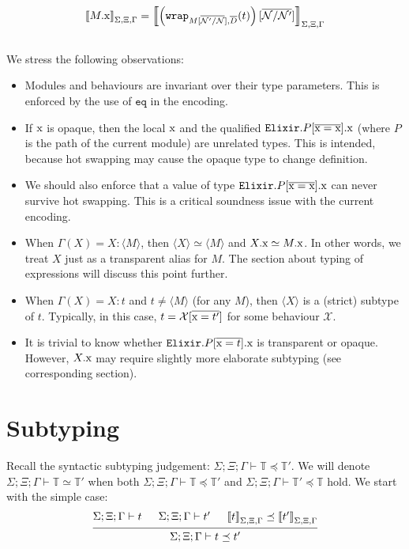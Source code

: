 \documentclass[12pt]{article}
\newcommand{\tx}{\text{\rm x}}
\newcommand{\BX}{\ensuremath{\mathcal{X}}}
\newcommand{\Next}{\ensuremath{\mathcal{N}}}
\newcommand{\Gammatop}{\ensuremath{\Xi}}
\newcommand{\Gammabot}{\ensuremath{\Gamma}}
\newcommand{\Elixir}{\texttt{Elixir}}
\newcommand{\wrap}{\texttt{wrap}}
\newcommand{\eq}{\texttt{eq}}
\begin{document}
$$\interp{M.\tx} = \interp{\left(\wrap_{M[\overline{\Next'/\Next}], \overline{D}}(t)\right)[\overline{\Next/\Next'}]}$$ \\

We stress the following observations:

\begin{itemize}
    \item Modules and behaviours are invariant over their type parameters. This is enforced
          by the use of $\eq$ in the encoding.
    \item If $\tx$ is opaque, then the local $\tx$ and the qualified $\Elixir.P[\overline{\tx = \tx}].\tx$
          (where $P$ is the path of the current module) are unrelated types.
          This is intended, because hot swapping may cause the opaque type to change definition.
    \item We should also enforce that a value of type $\Elixir.P[\overline{\tx = \tx}].\tx$
          can never survive hot swapping. This is a critical soundness issue with the current encoding.
    \item When $\Gammabot(X) = X : \langle M \rangle$, then $\langle X \rangle \simeq \langle M \rangle$
          and $X.\tx \simeq M.\tx$. In other words, we treat $X$ just as a transparent alias for $M$.
          The section about typing of expressions will discuss this point further.
    \item When $\Gammabot(X) = X : t$ and $t \neq \langle M \rangle$ (for any $M$), then $\langle X \rangle$
          is a (strict) subtype of $t$. Typically, in this case, $t = \BX[\overline{\tx = t'}]$ for some behaviour $\BX$.
    \item It is trivial to know whether $\Elixir.P[\overline{\tx = t}].\tx$ is transparent or opaque.
          However, $X.\tx$ may require slightly more elaborate subtyping (see corresponding section).
\end{itemize}

\section{Subtyping}

Recall the syntactic subtyping judgement: $\Sigma; \Gammatop; \Gammabot \vdash \mathbb{T} \preceq \mathbb{T}'$.
We will denote $\Sigma; \Gammatop; \Gammabot \vdash \mathbb{T} \simeq \mathbb{T}'$ when both $\Sigma; \Gammatop; \Gammabot \vdash \mathbb{T} \preceq \mathbb{T}'$ and $\Sigma; \Gammatop; \Gammabot \vdash \mathbb{T}' \preceq \mathbb{T}$ hold.
We start with the simple case:
\[
    \begin{prooftree}
        \hypo{ \Sigma; \Gammatop; \Gammabot \vdash t }
        \hypo{ \Sigma; \Gammatop; \Gammabot \vdash t' }
        \hypo{ \interp{t} \preceq \interp{t'} }
        \infer3{ \Sigma; \Gammatop; \Gammabot \vdash t \preceq t' }
    \end{prooftree}
\]
\end{document}
